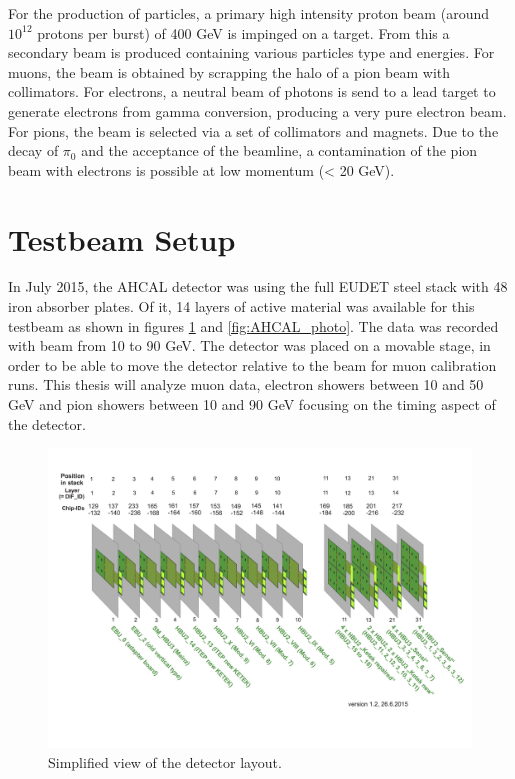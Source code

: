 For the production of particles, a primary high intensity proton beam (around $10^{12}$ protons per burst) of 400 GeV is impinged on a target. From this a secondary beam is produced containing various particles type and energies. For muons, the beam is obtained by scrapping the halo of a pion beam with collimators. For electrons, a neutral beam of photons is send to a lead target to generate electrons from gamma conversion, producing a very pure electron beam. For pions, the beam is selected via a set of collimators and magnets. Due to the decay of $\pi_0$ and the acceptance of the beamline, a contamination of the pion beam with electrons is possible at low momentum (< 20 GeV).

\section{Testbeam Setup}
\label{sec:TBsetup}

In July 2015, the AHCAL detector was using the full EUDET steel stack \cite{EUDET-Report-2010-02} with 48 iron absorber plates. Of it, 14 layers of active material was available for this testbeam as shown in figures \ref{fig:Det_layout} and \ref{fig:AHCAL_photo}. The data was recorded with beam from 10 to 90 GeV. The detector was placed on a movable stage, in order to be able to move the detector relative to the beam for muon calibration runs. This thesis will analyze muon data, electron showers between 10 and 50 GeV and pion showers between 10 and 90 GeV focusing on the timing aspect of the detector.

\begin{figure}[htbp!]
	\centering
	\includegraphics[width=1\linewidth]{chap5/fig_EnergyCalib/Detector_layout.png}
	\caption{Simplified view of the detector layout.} \label{fig:Det_layout}
\end{figure}

